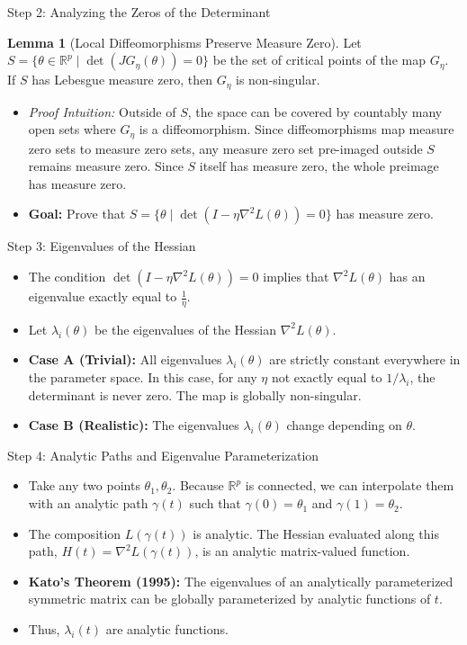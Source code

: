 \documentclass[10pt, aspectratio=169]{beamer}
\theoremstyle{definition}
\newtheorem{lem}{Lemma}
\begin{document}
\begin{frame}{Step 2: Analyzing the Zeros of the Determinant}
    \begin{lem}[Local Diffeomorphisms Preserve Measure Zero]\label{lem1}
        Let $S = \{\theta \in \mathbb{R}^p \mid \det(J G_\eta(\theta)) = 0\}$ be the set of critical points of the map $G_\eta$. If $S$ has Lebesgue measure zero, then $G_\eta$ is non-singular.
    \end{lem}
    \begin{itemize}
        \item \textit{Proof Intuition:} Outside of $S$, the space can be covered by countably many open sets where $G_\eta$ is a diffeomorphism. Since diffeomorphisms map measure zero sets to measure zero sets, any measure zero set pre-imaged outside $S$ remains measure zero. Since $S$ itself has measure zero, the whole preimage has measure zero.
        \item \textbf{Goal:} Prove that $S = \{\theta \mid \det(I - \eta \nabla^2 L(\theta)) = 0\}$ has measure zero.
    \end{itemize}
\end{frame}

\begin{frame}{Step 3: Eigenvalues of the Hessian}
    \begin{itemize}
        \item The condition $\det(I - \eta \nabla^2 L(\theta)) = 0$ implies that $\nabla^2 L(\theta)$ has an eigenvalue exactly equal to $\frac{1}{\eta}$.
        \item Let $\lambda_i(\theta)$ be the eigenvalues of the Hessian $\nabla^2 L(\theta)$.
        \item \textbf{Case A (Trivial):} All eigenvalues $\lambda_i(\theta)$ are strictly constant everywhere in the parameter space. In this case, for any $\eta$ not exactly equal to $1/\lambda_i$, the determinant is never zero. The map is globally non-singular.
        \item \textbf{Case B (Realistic):} The eigenvalues $\lambda_i(\theta)$ change depending on $\theta$.
    \end{itemize}
\end{frame}

\begin{frame}{Step 4: Analytic Paths and Eigenvalue Parameterization}
    \begin{itemize}
        \item Take any two points $\theta_1, \theta_2$. Because $\mathbb{R}^p$ is connected, we can interpolate them with an analytic path $\gamma(t)$ such that $\gamma(0) = \theta_1$ and $\gamma(1) = \theta_2$.
        \item The composition $L(\gamma(t))$ is analytic. The Hessian evaluated along this path, $H(t) = \nabla^2 L(\gamma(t))$, is an analytic matrix-valued function.
        \item \textbf{Kato's Theorem (1995):} The eigenvalues of an analytically parameterized symmetric matrix can be globally parameterized by analytic functions of $t$.
        \item Thus, $\lambda_i(t)$ are analytic functions.
    \end{itemize}
\end{frame}
\end{document}
